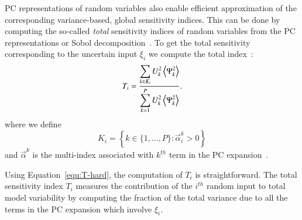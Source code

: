 PC representations of random variables also enable efficient
approximation of the corresponding variance-based, global
sensitivity indices. This can be done by computing the so-called {\it total} 
sensitivity indices of random variables from the PC representations or Sobol decomposition~\citep{Sobol:1993,Homma:1996,Sobol:2001}. To get the total sensitivity corresponding to the uncertain
input $\xi_i$ we compute the total index~\citep{LeMaitreKnio2010,Crestaux,Sudret}:
\begin{equation} \label{equ:T-hard}
   T_i =
         \frac{\displaystyle
               \sum_{k \in K_i} U_k^2 \left\langle {\Psi_k^2} \right\rangle}
              {\displaystyle\sum_{k = 1}^P U_k^2 \left\langle {\Psi_k^2} \right\rangle} .
\end{equation}
where we define \[
   K_i = \left\{ k \in \{1, \ldots, P\} :
           \vec{\alpha}^k_i > 0 \right\}
        \]
        and $\vec{\alpha}^k$ is the
multi-index associated with $k^{th}$ term in the
PC expansion~\cite{LeMaitreKnio2010}.

Using Equation~\eqref{equ:T-hard}, the computation of $T_i$ is straightforward.
The total sensitivity index $T_i$ measures the contribution of
the $i^{th}$ random input to total model variability by
computing the fraction of the total variance due to all the terms in the
PC expansion which involve $\xi_i$.



